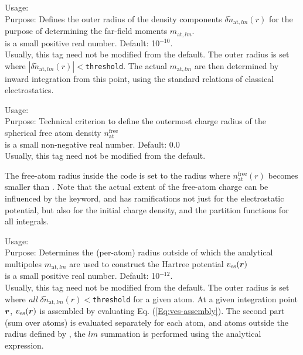 {
  \noindent
  Usage:  
    \\[1.0ex]
  Purpose: Defines the outer radius of the density
    components $\delta\tilde{n}_{\text{at},lm}(r)$ for the purpose of
    determining the far-field moments $m_{\text{at},lm}$. \\[1.0ex]
   is a small positive real number. Default:
    10$^{-10}$. \\
}
Usually, this tag need not be modified from the default. The outer
radius is set where
$|\delta\tilde{n}_{\text{at},lm}(r)|<$\texttt{threshold}. The actual
$m_{\text{at},lm}$ are then determined by inward integration from
this point, using the standard relations of classical electrostatics.

{
  \noindent
  Usage:  
    \\[1.0ex]
  Purpose: Technical criterion to define the outermost charge radius
    of the spherical free atom density $n_\text{at}^\text{free}$
    \\[1.0ex]
   is a small non-negative real number. Default: 0.0 \\
}
Usually, this tag need not be modified from the default. 

The free-atom radius inside the code is set to the radius where
$n_\text{at}^\text{free}(r)$ becomes smaller than
. Note that the actual extent of the free-atom
charge can be influenced by the  keyword, and
has ramifications not just for the electrostatic potential, but also
for the initial charge density, and the partition functions for all
integrals. 

{
  \noindent
  Usage:  
    \\[1.0ex]
  Purpose: Determines the (per-atom) radius outside of which the
    analytical multipoles $m_{\text{at},lm}$ are used to construct the
    Hartree potential $v_\text{es}(\mbox{\boldmath$r$})$ \\[1.0ex]
   is a small positive real number. Default: 10$^{-12}$.\\
}
Usually, this tag need not be modified from the default. The outer
radius is set where \emph{all}
$\delta\tilde{n}_{\text{at},lm}(r)<$\texttt{threshold} for a given
atom. At a given integration point $\mbox{\boldmath$r$}$, $v_\text{es}(\mbox{\boldmath$r$})$ is
assembled by evaluating Eq. (\ref{Eq:ves-assembly}). The second part
(sum over atoms) is evaluated separately for each atom, and atoms
outside the radius defined by , the
$lm$ summation is performed using the analytical expression.

